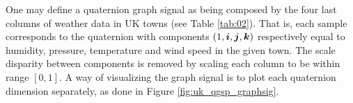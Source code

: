 




One may define a quaternion graph signal as being composed by the four last columns of weather data in UK towns (see Table \ref{tab:02}). That is, each sample corresponds to the quaternion with components $(1, \boldsymbol{i}, \boldsymbol{j}, \boldsymbol{k})$ respectively equal to humidity, pressure, temperature and wind speed in the given town. The scale disparity between components is removed by scaling each column to be within range $[0, 1]$. A way of visualizing the graph signal is to plot each quaternion dimension separately, as done in Figure \ref{fig:uk_qgsp_graphsig}.

